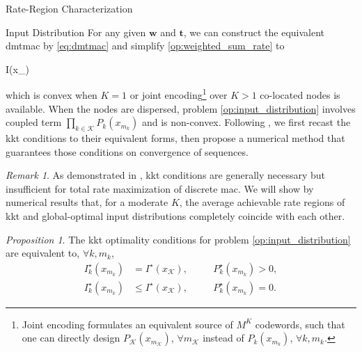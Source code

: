 \documentclass[journal,12pt,onecolumn,draftclsnofoot]{IEEEtran}
\theoremstyle{remark}
\newtheorem{proposition}{Proposition}
\newtheorem{remark}{Remark}
\begin{document}
\begin{section}{Rate-Region Characterization}
	\begin{subsection}{Input Distribution}
		For any given $\boldsymbol{w}$ and $\boldsymbol{t}$, we can construct the equivalent \gls{dmtmac} by \eqref{eq:dmtmac} and simplify \eqref{op:weighted_sum_rate} to
		\begin{maxi!}
			{}{I(x_{})}{\label{op:input_distribution}}{}
			\addConstraint{\eqref{co:sum_probability},\eqref{co:nonnegative_probability},}
		\end{maxi!}
		which is convex when $K=1$ or joint encoding\footnote{Joint encoding formulates an equivalent source of $M^K$ codewords, such that one can directly design $P_{\mathcal{K}}(x_{m_{\mathcal{K}}})$, $\forall m_{\mathcal{K}}$ instead of $P_k(x_{m_k})$, $\forall k,m_k$.} over $K>1$ co-located nodes is available.
		When the nodes are dispersed, problem \eqref{op:input_distribution} involves coupled term $\prod_{k \in \mathcal{K}} P_k(x_{m_k})$ and is non-convex.
		Following \cite{Rezaeian2004}, we first recast the \gls{kkt} conditions to their equivalent forms, then propose a numerical method that guarantees those conditions on convergence of sequences.
		\begin{remark}
			As demonstrated in \cite{Buhler2011}, \gls{kkt} conditions are generally necessary but insufficient for total rate maximization of discrete \gls{mac}.
			We will show by numerical results that, for a moderate $K$, the average achievable rate regions of \gls{kkt} and global-optimal input distributions completely coincide with each other.
			\label{re:input_kkt_distribution}
		\end{remark}
		\begin{proposition}
			The \gls{kkt} optimality conditions for problem \eqref{op:input_distribution} are equivalent to, $\forall k,m_k$,
			\begin{subequations}
				\label{eq:input_kkt_condition}
				\begin{alignat}{2}
					I_k^\star(x_{m_k}) & = I^\star(x_{\mathcal{K}}), \quad   &  & P_k^\star(x_{m_k}) > 0,\label{eq:probable_states} \\
					I_k^\star(x_{m_k}) & \le I^\star(x_{\mathcal{K}}), \quad &  & P_k^\star(x_{m_k}) = 0.\label{eq:dropped_states}
				\end{alignat}
			\end{subequations}
			\label{pr:input_kkt_condition}
		\end{proposition}


\end{subsection}
\end{section}
\end{document}
